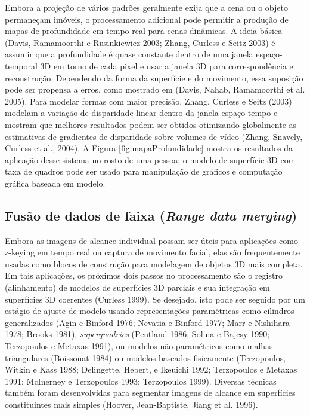 \documentclass{article}
\begin{document}
Embora a projeção de vários padrões geralmente exija que a cena ou o objeto permaneçam imóveis, o processamento adicional pode permitir a produção de mapas de profundidade em tempo real para cenas dinâmicas. A ideia básica (Davis, Ramamoorthi e Rusinkiewicz 2003; Zhang, Curless e Seitz 2003) é assumir que a profundidade é quase constante dentro de uma janela espaço-temporal 3D em torno de cada pixel e usar a janela 3D para correspondência e reconstrução. Dependendo da forma da superfície e do movimento, essa suposição pode ser propensa a erros, como mostrado em (Davis, Nahab, Ramamoorthi et al. 2005). Para modelar formas com maior precisão, Zhang, Curless e Seitz (2003) modelam a variação de disparidade linear dentro da janela espaço-tempo e mostram que melhores resultados podem ser obtidos otimizando globalmente as estimativas de gradientes de disparidade sobre volumes de vídeo (Zhang, Snavely, Curless et al., 2004). A Figura \ref{fig:mapaProfundidade} mostra os resultados da aplicação desse sistema no rosto de uma pessoa; o modelo de superfície 3D com taxa de quadros pode ser usado para manipulação de gráficos e computação gráfica baseada em modelo.

\subsection{Fusão de dados de faixa (\textit{Range data merging})}
\label{subSec:rangeDataMerging}

Embora as imagens de alcance individual possam ser úteis para aplicações como z-keying em tempo real ou captura de movimento facial, elas são frequentemente usadas como blocos de construção para modelagem de objetos 3D mais completa. Em tais aplicações, os próximos dois passos no processamento são o registro (alinhamento) de modelos de superfícies 3D parciais e sua integração em superfícies 3D coerentes (Curless 1999). Se desejado, isto pode ser seguido por um estágio de ajuste de modelo usando representações paramétricas como cilindros generalizados (Agin e Binford 1976; Nevatia e Binford 1977; Marr e Nishihara 1978; Brooks 1981), \textit{superquadrics} (Pentland 1986; Solina e Bajcsy 1990; Terzopoulos e Metaxas 1991), ou modelos não paramétricos como malhas triangulares (Boissonat 1984) ou modelos baseados fisicamente (Terzopoulos, Witkin e Kass 1988; Delingette, Hebert, e Ikeuichi 1992; Terzopoulos e Metaxas 1991; McInerney e Terzopoulos 1993; Terzopoulos 1999). Diversas técnicas também foram desenvolvidas para segmentar imagens de alcance em superfícies constituintes mais simples (Hoover, Jean-Baptiste, Jiang et al. 1996).
\end{document}
